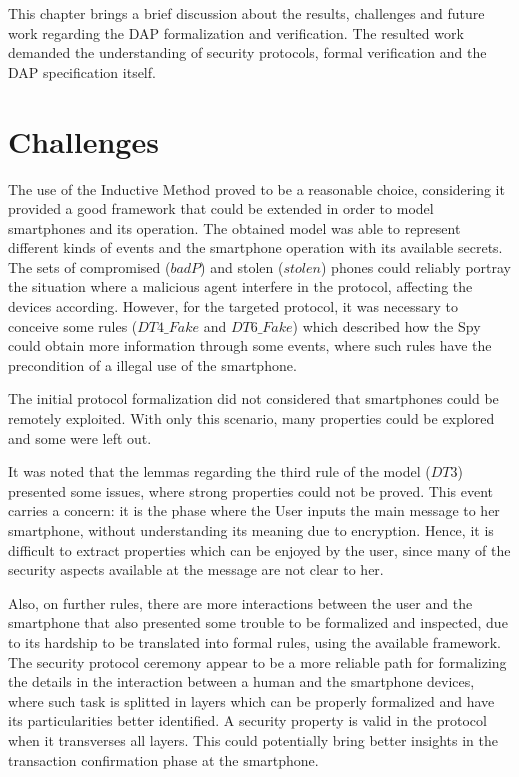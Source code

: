 \label{chap:conclusion}
This chapter brings a brief discussion about the results, challenges and future work regarding the DAP formalization and verification. The resulted work demanded the understanding of security protocols, formal verification and the DAP specification itself.

\section{Challenges}

The use of the Inductive Method proved to be a reasonable choice, considering it provided a good framework that could be extended in order to model smartphones and its operation. The obtained model was able to represent different kinds of events and the smartphone operation with its available secrets. The sets of compromised ($badP$) and stolen ($stolen$) phones could reliably portray the situation where a malicious agent interfere in the protocol, affecting the devices according. However, for the targeted protocol, it was necessary to conceive some rules ($DT4\_Fake$ and $DT6\_Fake$) which described how the Spy could obtain more information through some events, where such rules have the precondition of a illegal use of the smartphone.

The initial protocol formalization did not considered that smartphones could be remotely exploited. With only this scenario, many properties could be explored and some were left out.

It was noted that the lemmas regarding the third rule of the model ($DT3$) presented some issues, where strong properties could not be proved. This event carries a concern: it is the phase where the User inputs the main message to her smartphone, without understanding its meaning due to encryption. Hence, it is difficult to extract properties which can be enjoyed by the user, since many of the security aspects available at the message are not clear to her.

Also, on further rules, there are more interactions between the user and the smartphone that also presented some trouble to be formalized and inspected, due to its hardship to be translated into formal rules, using the available framework. The security protocol ceremony \cite{Ellison07} appear to be a more reliable path for formalizing the details in the interaction between a human and the smartphone devices, where such task is splitted in layers which can be properly formalized and have its particularities better identified. A security property is valid in the protocol when it transverses all layers. This could potentially bring better insights in the transaction confirmation phase at the smartphone.



